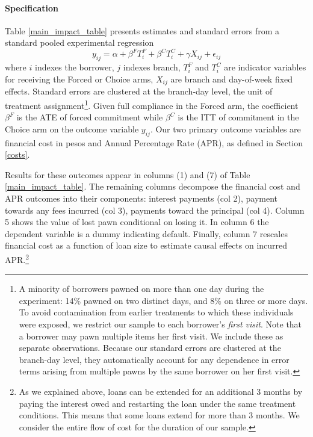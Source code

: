 \documentclass[12pt, a4paper]{article}
\begin{document}
\paragraph*{Specification} Table \ref{main_impact_table} presents estimates and standard errors from a standard pooled experimental regression 
\begin{equation} \label{basic_reg}
    y_{ij} = \alpha + \beta^F T_{i}^F + \beta^C T_{i}^C + \gamma X_{ij} + \epsilon_{ij}
\end{equation}
where $i$ indexes the borrower, $j$ indexes branch, $T_{i}^F$ and $T_{i}^C$ are indicator variables for receiving the Forced or Choice arms, $X_{ij}$ are branch and day-of-week fixed effects. Standard errors are clustered at the branch-day level, the unit of treatment assignment\footnote{A minority of borrowers pawned on more than one day during the experiment: 14\% pawned on two distinct days, and 8\% on three or more days. To avoid contamination from earlier treatments to which these individuals were exposed, we restrict our sample to each borrower's \emph{first visit}. Note that a borrower may pawn multiple items her first visit. We include these as separate observations. Because our standard errors are clustered at the branch-day level, they automatically account for any dependence in error terms arising from multiple pawns by the same borrower on her first visit.}.
Given full compliance in the Forced arm, the coefficient $\beta^F$ is the ATE of forced commitment while $\beta^C$ is the ITT of commitment in the Choice arm on the outcome variable $y_{ij}$.
Our two primary outcome variables are financial cost in pesos and Annual Percentage Rate (APR), as defined in Section \ref{costs}. 


Results for these outcomes appear in columns (1) and (7) of Table \ref{main_impact_table}.
The remaining columns decompose the financial cost and APR outcomes into their components: interest payments (col 2), payment towards any fees incurred (col 3), payments toward the principal (col 4). Column 5 shows the value of lost pawn conditional on losing it.  In column 6 the dependent variable is a dummy indicating default.  Finally, column 7 rescales financial cost as a function of loan size to estimate causal effects on incurred APR.\footnote{As we explained above, loans can be extended for an additional 3 months by paying the interest owed and restarting the loan under the same treatment conditions. This means that some loans extend for more than 3 months. We consider the entire flow of cost for the duration of our sample.}  
\end{document}
